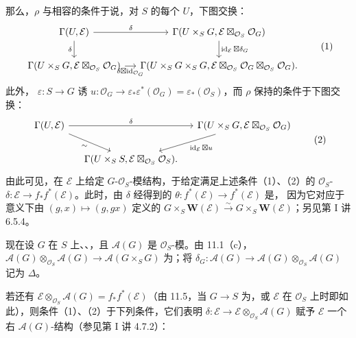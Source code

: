 那么，$\rho$ 与相容的条件于说，对 $S$ 的每个 $U$，下图交换：
\[
\begin{tikzcd}[column sep=small]
\Gamma(U,\mathcal E)\arrow[r,"\delta"]\arrow[d,"\delta"']&
\Gamma(U\times_S G,\mathcal E\boxtimes_{\mathcal O_S}\mathcal O_G)
\arrow[d,"\operatorname{id}_{\mathcal E}\boxtimes\delta_G"]\\
\Gamma(U\times_S G,\mathcal E\boxtimes_{\mathcal O_S}\mathcal O_G)
\arrow[r,"\delta\boxtimes\operatorname{id}_{\mathcal O_G}"']&
\Gamma(U\times_S G\times_S G,\mathcal E\boxtimes_{\mathcal O_S}\mathcal O_G\boxtimes_{\mathcal O_S}\mathcal O_G).
\end{tikzcd}\tag{1}
\]
此外， $\varepsilon:S\to G$ 诱 $u:\mathcal O_G\to\varepsilon_*\varepsilon^*(\mathcal O_G)=\varepsilon_*(\mathcal O_S)$，而 $\rho$ 保持的条件于下图交换：
\[
\begin{tikzcd}[column sep=small]
\Gamma(U,\mathcal E)\arrow[rr,"\delta"]\arrow[dr,"\sim"']&&
\Gamma(U\times_S G,\mathcal E\boxtimes_{\mathcal O_S}\mathcal O_G)
\arrow[dl,"\operatorname{id}_{\mathcal E}\boxtimes u"]\\
&\Gamma(U\times_S S,\mathcal E\boxtimes_{\mathcal O_S}\mathcal O_S).&
\end{tikzcd}\tag{2}
\]
由此可见，在 $\mathcal E$ 上给定 $G$-$\mathcal O_S$-模结构，于给定满足上述条件（1）、（2）的 $\mathcal O_S$- $\delta:\mathcal E\to f_*f^*(\mathcal E)$。此时，由 $\delta$ 经得到的 $\theta:f^*(\mathcal E)\to f^*(\mathcal E)$ 是，
因为它对应于意义下由 $(g,x)\mapsto(g,gx)$ 定义的 $G\times_S\mathbf W(\mathcal E)\xrightarrow{\sim}G\times_S\mathbf W(\mathcal E)$；另见第 I 讲 6.5.4。

现在设 $G$ 在 $S$ 上、、，且 $\mathcal A(G)$ 是 $\mathcal O_S$-模。由 11.1（c）， $\mathcal A(G)\otimes_{\mathcal O_S}\mathcal A(G)\to\mathcal A(G\times_S G)$ 为；将 $\delta_G:\mathcal A(G)\to\mathcal A(G)\otimes_{\mathcal O_S}\mathcal A(G)$ 记为 $\Delta$。

若还有 $\mathcal E\otimes_{\mathcal O_S}\mathcal A(G)=f_*f^*(\mathcal E)$（由 11.5，当 $G\to S$ 为，或 $\mathcal E$ 在 $\mathcal O_S$ 上时即如此），则条件（1）、（2）于下列条件，它们表明 $\delta:\mathcal E\to\mathcal E\otimes_{\mathcal O_S}\mathcal A(G)$ 赋予 $\mathcal E$ 一个右 $\mathcal A(G)$-结构（参见第 I 讲 4.7.2）：

